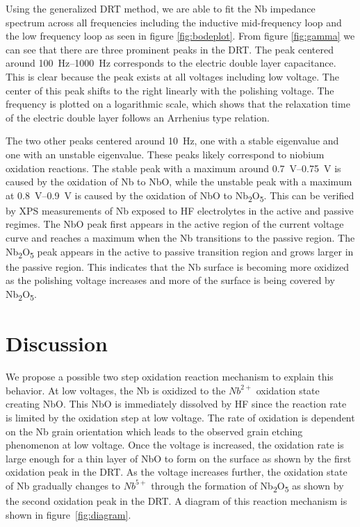 Using the generalized DRT method, we are able to fit the Nb impedance spectrum across all frequencies including the inductive mid-frequency loop and the low frequency loop as seen in figure \ref{fig:bodeplot}. From figure \ref{fig:gamma} we can see that there are three prominent peaks in the DRT. The peak centered around \qtyrange{100}{1000}{\hertz} corresponds to the electric double layer capacitance. This is clear because the peak exists at all voltages including low voltage. The center of this peak shifts to the right linearly with the polishing voltage. The frequency is plotted on a logarithmic scale, which shows that the relaxation time of the electric double layer follows an Arrhenius type relation.

The two other peaks centered around \qty{10}{\hertz}, one with a stable eigenvalue and one with an unstable eigenvalue. These peaks likely correspond to niobium oxidation reactions. The stable peak with a maximum around \qtyrange{0.7}{0.75}{\volt} is caused by the oxidation of Nb to NbO, while the unstable peak with a maximum at \qtyrange{0.8}{0.9}{\volt} is caused by the oxidation of NbO to Nb\textsubscript{2}O\textsubscript{5}. This can be verified by XPS measurements of Nb exposed to HF electrolytes in the active and passive regimes.\cite{ranjith2018anodic} The NbO peak first appears in the active region of the current voltage curve and reaches a maximum when the Nb transitions to the passive region. The Nb\textsubscript{2}O\textsubscript{5} peak appears in the active to passive transition region and grows larger in the passive region. This indicates that the Nb surface is becoming more oxidized as the polishing voltage increases and more of the surface is being covered by Nb\textsubscript{2}O\textsubscript{5}. 






\section{Discussion}

We propose a possible two step oxidation reaction mechanism to explain this behavior. At low voltages, the Nb is oxidized to the $Nb^{2+}$ oxidation state creating NbO. This NbO is immediately dissolved by HF since the reaction rate is limited by the oxidation step at low voltage. The rate of oxidation is dependent on the Nb grain orientation which leads to the observed grain etching phenomenon at low voltage. Once the voltage is increased, the oxidation rate is large enough for a thin layer of NbO to form on the surface as shown by the first oxidation peak in the DRT. As the voltage increases further, the oxidation state of Nb gradually changes to $Nb^{5+}$ through the formation of Nb\textsubscript{2}O\textsubscript{5} as shown by the second oxidation peak in the DRT. A diagram of this reaction mechanism is shown in figure~\ref{fig:diagram}.




